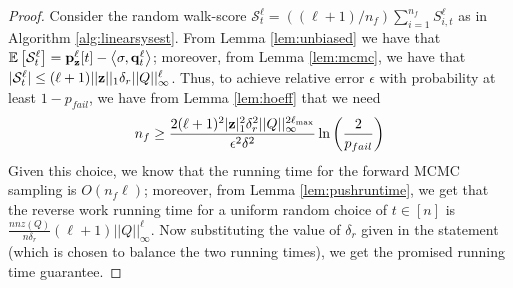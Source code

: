 \begin{proof}
Consider the random walk-score $\mathcal{S}_{t}^{\ell} = ((\ell+1)/n_f)\sum_{i=1}^{n_f}S_{i,t}^{\ell}$ as in Algorithm \ref{alg:linearsysest}. 
From Lemma \ref{lem:unbiased} we have that ${\mathbb{E}}\left[\mathcal{S}_{t}^{\ell}\right] = {\mathbf{p}}_\mathbf{z}^{\ell}[t] - \left< \sigma, \mathbf{q}^{\ell}_t \right>$; moreover, from Lemma \ref{lem:mcmc}, we have that $|\mathcal{S}_{t}^{\ell}|\leq (\ell+1)||\mathbf{z}||_1\delta_r||Q||_{\infty}^{\ell}$.
Thus, to achieve relative error $\epsilon$ with probability at least $1-p_{fail}$, we have from Lemma \ref{lem:hoeff} that we need
\begin{align*}
n_f\geq \frac{2 (\ell+1)^2|\mathbf{z}|_1^2 \delta_r^2 ||Q||_{\infty}^{2\ell_{\max}}}{\epsilon^2\delta^2}\ln \left(\frac{2}{p_{fail}}\right)
\end{align*}
Given this choice, we know that the running time for the forward MCMC sampling is $O(n_f\ell)$; moreover, from Lemma \ref{lem:pushruntime}, we get that the reverse work running time for a uniform random choice of $t\in[n]$ is $\frac{nnz(Q)}{n\delta_r}(\ell+1)||Q||_{\infty}^{\ell}$. 
Now substituting the value of $\delta_r$ given in the statement (which is chosen to balance the two running times), we get the promised running time guarantee.
\end{proof}
%
%
